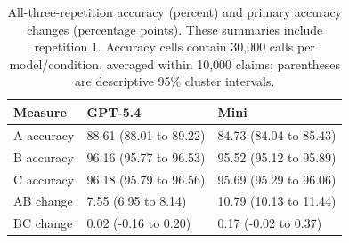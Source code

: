 \begin{table}[htbp]\centering\small
\caption{All-three-repetition accuracy (percent) and primary accuracy changes (percentage points). These summaries include repetition 1. Accuracy cells contain 30,000 calls per model/condition, averaged within 10,000 claims; parentheses are descriptive 95\% cluster intervals.}\label{tab:repeat}
\begin{tabularx}{\linewidth}{lXX}\toprule
Measure & GPT-5.4 & Mini \\\midrule
A accuracy & 88.61 (88.01 to 89.22) & 84.73 (84.04 to 85.43) \\
B accuracy & 96.16 (95.77 to 96.53) & 95.52 (95.12 to 95.89) \\
C accuracy & 96.18 (95.79 to 96.56) & 95.69 (95.29 to 96.06) \\
AB change & 7.55 (6.95 to 8.14) & 10.79 (10.13 to 11.44) \\
BC change & 0.02 (-0.16 to 0.20) & 0.17 (-0.02 to 0.37) \\
\bottomrule
\end{tabularx}
\end{table}